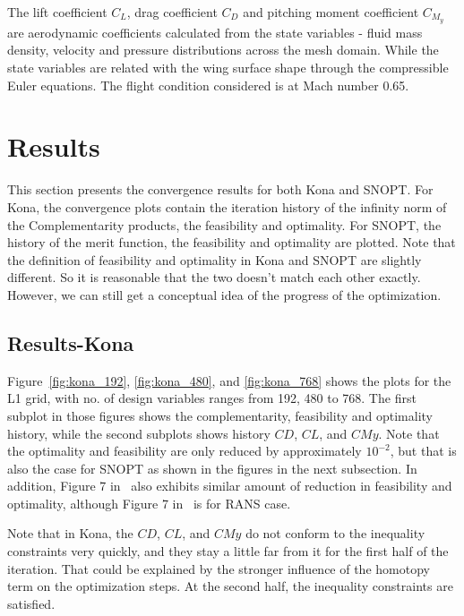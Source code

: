 The lift coefficient $C_L$, drag coefficient $C_D$ and pitching moment coefficient $C_{M_y}$ are aerodynamic coefficients calculated from the state variables - fluid mass density, velocity and pressure distributions across the mesh domain. While the state variables are related with the wing surface shape through the compressible Euler equations.  The flight condition considered is at Mach number 0.65. 


\section{Results}
This section presents the convergence results for both Kona and SNOPT. For Kona, the convergence plots contain 
the iteration history of the infinity norm of the Complementarity products, the feasibility and optimality. For SNOPT, 
the history of the merit function, the feasibility and optimality are plotted. Note that the definition of feasibility and optimality in Kona and SNOPT are slightly different. So it is reasonable that the two doesn't match each other exactly. 
However, we can still get a conceptual idea of the progress of the optimization.    
\subsection{Results-Kona}
Figure~\ref{fig:kona_192}, \ref{fig:kona_480}, and \ref{fig:kona_768} shows the plots for the L1 grid, with no. of 
design variables ranges from 192, 480 to 768. The first subplot in those figures shows the complementarity, feasibility and optimality history, while the second subplots shows history $CD$, $CL$, and $CMy$. Note that the 
optimality and feasibility are only reduced by approximately $10^{-2}$, but that is also the case for SNOPT as shown in the figures in the next subsection. In addition, Figure 7 in~\cite{2015lyu_crm} also exhibits similar amount of 
reduction in feasibility and optimality, although Figure 7 in~\cite{2015lyu_crm} is for RANS case. 

Note that in Kona, the $CD$, $CL$, and $CMy$ do not conform to the inequality constraints very quickly, and they 
stay a little far from it for the first half of the iteration. That could be explained by the stronger influence of the homotopy term on the optimization steps. At the second half, the inequality constraints are satisfied.   


